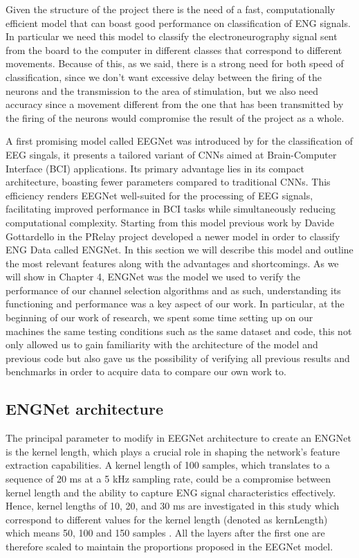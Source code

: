 \documentclass{Configuration_Files/PoliMi3i_thesis}
\begin{document}
Given the structure of the project there is the need of a fast, computationally efficient model that can boast good performance on classification of ENG signals.
In particular we need this model to classify the electroneurography signal sent from the board to the computer in different classes that correspond to different movements.
Because of this, as we said, there is a strong need for both speed of classification, since we don't want excessive delay between the firing of the neurons and the transmission to the area of stimulation, but we also need accuracy since a movement different from the one that has been transmitted by the firing of the neurons would compromise the result of the project as a whole.

A first promising model called EEGNet was introduced by \cite{lawhernEEGNetCompactConvolutional2018} for the classification of EEG singals, it presents a tailored variant of CNNs aimed at Brain-Computer Interface (BCI) applications. Its primary advantage lies in its compact architecture, boasting fewer parameters compared to traditional CNNs. This efficiency renders EEGNet well-suited for the processing of EEG signals, facilitating improved performance in BCI tasks while simultaneously reducing computational complexity. \cite{tesiDavide}
Starting from this model previous work by Davide Gottardello in the PRelay project developed a newer model in order to classify ENG Data called ENGNet.
In this section we will describe this model and outline the most relevant features along with the advantages and shortcomings.
As we will show in Chapter 4, ENGNet was the model we used to verify the performance of our channel selection algorithms and as such, understanding its functioning and performance was a key aspect of our work.
In particular, at the beginning of our work of research, we spent some time setting up on our machines the same testing conditions such as the same dataset and code, this not only allowed us to gain familiarity with the architecture of the model and previous code but also gave us the possibility of verifying all previous results and benchmarks in order to acquire data to compare our own work to. 

\subsection{ENGNet architecture}

The principal parameter to modify in EEGNet architecture to create an ENGNet is the kernel length, which plays a crucial role in shaping the network’s feature extraction capabilities. \cite{tesiDavide}
A kernel length of 100 samples, which translates to a sequence of 20 ms at a 5 kHz sampling rate, could be a compromise between kernel length and the ability to capture ENG signal characteristics effectively. Hence, kernel lengths of 10, 20, and 30 ms are investigated in this study which correspond to different values for the kernel length (denoted as kernLength) which means 50, 100 and 150 samples \cite{tesiDavide}.
All the layers after the first one are therefore scaled to maintain the proportions proposed in the EEGNet model.
\end{document}
